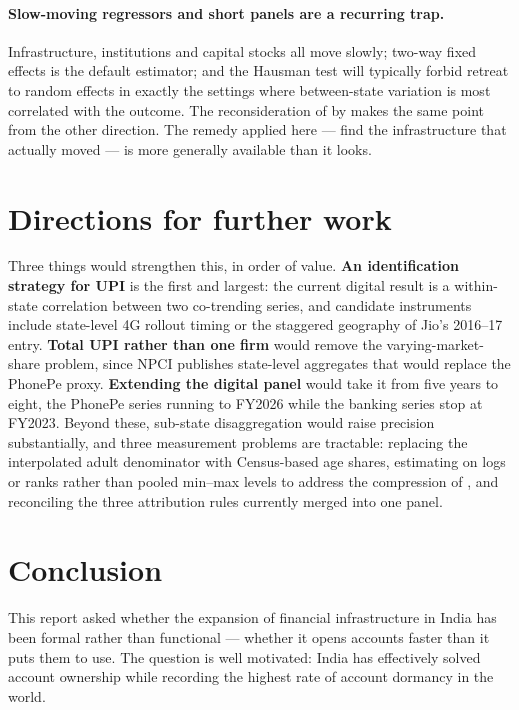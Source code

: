\paragraph{Slow-moving regressors and short panels are a recurring trap.} Infrastructure,
institutions and capital stocks all move slowly; two-way fixed effects is the default estimator;
and the Hausman test will typically forbid retreat to random effects in exactly the settings where
between-state variation is most correlated with the outcome. The reconsideration of
\citet{burgess2005} by \citet{buliskeria2022} makes the same point from the other direction. The
remedy applied here --- find the infrastructure that actually moved --- is more generally available
than it looks.

\section{Directions for further work}
\label{sec:further}

Three things would strengthen this, in order of value. \textbf{An identification strategy for UPI}
is the first and largest: the current digital result is a within-state correlation between two
co-trending series, and candidate instruments include state-level 4G rollout timing or the
staggered geography of Jio's 2016--17 entry. \textbf{Total UPI rather than one firm} would remove
the varying-market-share problem, since NPCI publishes state-level aggregates that would replace
the PhonePe proxy. \textbf{Extending the digital panel} would take it from five years to eight, the
PhonePe series running to FY2026 while the banking series stop at FY2023. Beyond these,
sub-state disaggregation would raise precision substantially, and three measurement problems are
tractable: replacing the interpolated adult denominator with Census-based age shares, estimating on
logs or ranks rather than pooled min--max levels to address the compression of \Usage{}, and
reconciling the three attribution rules currently merged into one panel.

\section{Conclusion}
\label{sec:conclusion}

This report asked whether the expansion of financial infrastructure in India has been formal rather
than functional --- whether it opens accounts faster than it puts them to use. The question is well
motivated: India has effectively solved account ownership while recording the highest rate of
account dormancy in the world.

